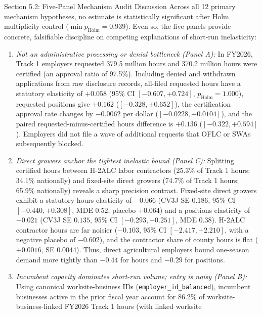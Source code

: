 \begin{llmdraft}{Section 5.2: Five-Panel Mechanism Audit Discussion}
Across all 12 primary mechanism hypotheses, no estimate is statistically
significant after Holm multiplicity control ($\min p_{\text{Holm}} = 0.939$).
Even so, the five panels provide concrete, falsifiable discipline on competing
explanations of short-run inelasticity:

\begin{enumerate}
  \item \emph{Not an administrative processing or denial bottleneck (Panel A):}
    In FY2026, Track 1 employers requested 379.5 million hours and 370.2
    million hours were certified (an approval ratio of 97.5\%). Including
    denied and withdrawn applications from raw disclosure records, all-filed
    requested hours have a statutory elasticity of $+0.058$ (95\% CI $[-0.607,
    +0.724]$, $p_{\text{Holm}}=1.000$), requested positions give $+0.162$
    ($[-0.328, +0.652]$), the certification approval rate changes by $-0.0062$
    per dollar ($[-0.0228, +0.0104]$), and the paired requested-minus-certified
    hours difference is $+0.136$ ($[-0.322, +0.594]$). Employers did not file
    a wave of additional requests that OFLC or SWAs subsequently blocked.
  \item \emph{Direct growers anchor the tightest inelastic bound (Panel C):}
    Splitting certified hours between H-2ALC labor contractors (25.3\% of Track 1
    hours; 34.1\% nationally) and fixed-site direct growers (74.7\% of Track 1
    hours; 65.9\% nationally) reveals a sharp precision contrast. Fixed-site
    direct growers exhibit a statutory hours elasticity of $-0.066$ (CV3J
    SE $0.186$, 95\% CI $[-0.440, +0.308]$, MDE $0.52$; placebo $+0.064$) and
    a positions elasticity of $-0.021$ (CV3J SE $0.135$, 95\% CI $[-0.293,
    +0.251]$, MDE $0.38$). H-2ALC contractor hours are far noisier ($-0.103$,
    95\% CI $[-2.417, +2.210]$, with a negative placebo of $-0.602$), and the
    contractor share of county hours is flat ($+0.0016$, SE $0.0044$). Thus,
    direct agricultural employers bound one-season demand more tightly than
    $-0.44$ for hours and $-0.29$ for positions.
  \item \emph{Incumbent capacity dominates short-run volume; entry is noisy
    (Panel B):} Using canonical worksite-business IDs (\texttt{employer\_id\_balanced}),
    incumbent businesses active in the prior fiscal year account for 86.2\% of
    worksite-business-linked FY2026 Track 1 hours (with linked worksite

\end{enumerate}
\end{llmdraft}
